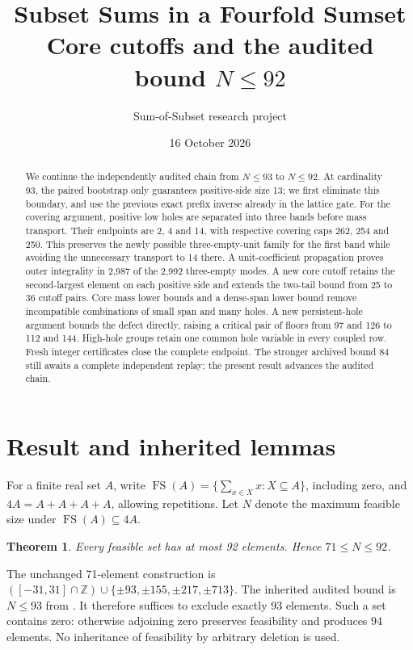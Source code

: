 \documentclass[11pt,a4paper]{article}
\title{Subset Sums in a Fourfold Sumset\\\large Core cutoffs and the audited bound $N\le92$}
\author{Sum-of-Subset research project}
\date{16 October 2026}
\newcommand{\FS}{\operatorname{FS}}
\newcommand{\Z}{\mathbb Z}
\newtheorem{theorem}{Theorem}[section]
\begin{document}
\maketitle
\begin{abstract}
We continue the independently audited chain from $N\le93$ to $N\le92$.
At cardinality 93, the paired bootstrap only guarantees positive-side
size 13; we first eliminate this boundary, and use the previous exact
prefix inverse already in the lattice gate. For the covering argument,
positive low holes are separated into three bands before mass transport.
Their endpoints are 2, 4 and 14, with respective covering caps 262, 254
and 250. This preserves the newly possible three-empty-unit family for
the first band while avoiding the unnecessary transport to 14 there.
A unit-coefficient propagation proves outer integrality in 2,987 of
the 2,992 three-empty modes. A new core cutoff retains the second-largest
element on each positive side and extends the two-tail bound from 25
to 36 cutoff pairs. Core mass lower bounds and a dense-span
lower bound remove incompatible combinations of small span and many
holes. A new persistent-hole argument bounds the defect directly,
raising a critical pair of floors from 97 and 126 to 112 and 144.
High-hole groups retain one common hole variable in every coupled row.
Fresh integer certificates close the complete endpoint. The stronger
archived bound 84 still awaits a complete independent replay; the
present result advances the audited chain.
\end{abstract}

\section{Result and inherited lemmas}
For a finite real set $A$, write
$\FS(A)=\{\sum_{x\in X}x:X\subseteq A\}$, including zero, and
$4A=A+A+A+A$, allowing repetitions. Let $N$ denote the maximum feasible
size under $\FS(A)\subseteq4A$.
\begin{theorem}\label{main}
Every feasible set has at most 92 elements. Hence $71\le N\le92$.
\end{theorem}
The unchanged 71-element construction is
$([-31,31]\cap\Z)\cup\{\pm93,\pm155,\pm217,\pm713\}$.
The inherited audited bound is $N\le93$ from \cite{previous}.
It therefore suffices to exclude exactly 93 elements. Such a set contains
zero: otherwise adjoining zero preserves feasibility and produces 94
elements. No inheritance of feasibility by arbitrary deletion is used.
\end{document}
